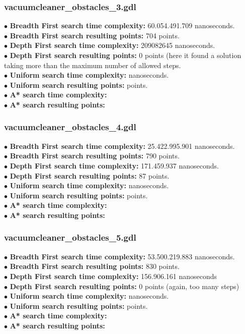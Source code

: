 \documentclass[11pt]{article}
\begin{document}
\subsubsection{vacuumcleaner\_obstacles\_3.gdl}
$\bullet$ {\bf Breadth First search time complexity: } 60.054.491.709 nanoseconds. \\
$\bullet$ {\bf Breadth First search resulting points: } 704 points. \\
$\bullet$ {\bf Depth First search time complexity: } 209082645 nanoseconds. \\
$\bullet$ {\bf Depth First search resulting points: } 0 points (here it found a solution taking more than the maximum 
number of allowed steps. \\
$\bullet$ {\bf Uniform search time complexity: } nanoseconds. \\
$\bullet$ {\bf Uniform search resulting points: } points. \\
$\bullet$ {\bf A* search time complexity: } \\ 
$\bullet$ {\bf A* search resulting points: }\\
\subsubsection{vacuumcleaner\_obstacles\_4.gdl}
$\bullet$ {\bf Breadth First search time complexity: } 25.422.995.901 nanoseconds. \\
$\bullet$ {\bf Breadth First search resulting points: } 790 points. \\
$\bullet$ {\bf Depth First search time complexity: } 171.459.937 nanoseconds.\\
$\bullet$ {\bf Depth First search resulting points: } 87 points.\\
$\bullet$ {\bf Uniform search time complexity: } nanoseconds. \\
$\bullet$ {\bf Uniform search resulting points: } points. \\
$\bullet$ {\bf A* search time complexity: } \\ 
$\bullet$ {\bf A* search resulting points: }\\
\subsubsection{vacuumcleaner\_obstacles\_5.gdl}
$\bullet$ {\bf Breadth First search time complexity: } 53.500.219.883 nanoseconds. \\
$\bullet$ {\bf Breadth First search resulting points: } 830 points. \\
$\bullet$ {\bf Depth First search time complexity: } 156.906.161 nanoseconds\\
$\bullet$ {\bf Depth First search resulting points: } 0 points (again, too many steps)\\
$\bullet$ {\bf Uniform search time complexity: } nanoseconds. \\
$\bullet$ {\bf Uniform search resulting points: } points. \\
$\bullet$ {\bf A* search time complexity: } \\ 
$\bullet$ {\bf A* search resulting points: }\\
\end{document}
